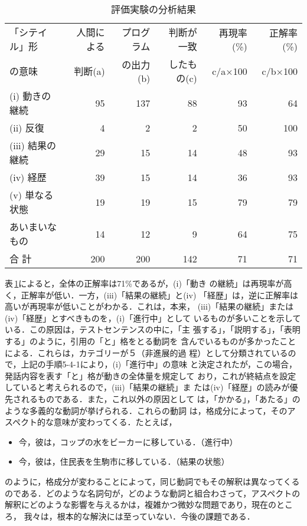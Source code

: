 \begin{table}[htb]
\caption{評価実験の分析結果}
\label{tab:evaluation}
\centering
\begin{tabular}{|l|r|r|r|r|r|}  \hline
「シテイル」形   & 人間による & プログラム & 判断が一致  & 再現率(\%) & 正解率(\%) \\ 
 の意味          & 判断(a)    & の出力(b)  & したもの(c) & c/a×100   & c/b×100 \\ \hline\hline
(i) 動きの継続   &  95 & 137 &  88 & 93 & 64 \\ \hline
(ii) 反復        &   4 &   2 &   2 & 50 & 100 \\ \hline
(iii) 結果の継続 &  29 &  15 &  14 & 48 & 93 \\ \hline
(iv) 経歴        &  39 &  15 &  14 & 36 & 93 \\ \hline
(v) 単なる状態   &  19 &  19 &  15 & 79 & 79 \\ \hline
あいまいなもの   &  14 &  12 &   9 & 64 & 75 \\ \hline
合  計           & 200 & 200 & 142 & 71 & 71 \\ \hline
\end{tabular}
\end{table}
\vspace*{-2mm}
表\,\ref{tab:evaluation}によると，全体の正解率は71\%であるが，(i)「動き
の継続」は再現率が高く，正解率が低い．一方，(iii)「結果の継続」と(iv)
「経歴」は，逆に正解率は高いが再現率が低いことがわかる．これは，本来，
(iii)「結果の継続」または(iv)「経歴」とすべきものを，(i)「進行中」として
いるものが多いことを示している．この原因は，テストセンテンスの中に，「主
張する」，「説明する」，「表明する」のように，引用の「と」格をとる動詞を
含んでいるものが多かったことによる．これらは，カテゴリーが５（非進展的過
程）として分類されているので，上記の手順5-4-1により，(i)「進行中」の意味
と決定されたが，この場合，発話内容を表す「と」格が動きの全体量を規定して
おり，これが終結点を設定していると考えられるので，(iii)「結果の継続」ま
たは(iv)「経歴」の読みが優先されるものである．また，これ以外の原因として
は，「かかる」，「あたる」のような多義的な動詞が挙げられる．これらの動詞
は，格成分によって，そのアスペクト的な意味が変わってくる．たとえば，
\begin{itemize}
\item [] 今，彼は，コップの水をビーカーに移している．（進行中）
\item [] 今，彼は，住民表を生駒市に移している．（結果の状態）
\end{itemize}
のように，格成分が変わることによって，同じ動詞でもその解釈は異なってくる
のである．どのような名詞句が，どのような動詞と組合わさって，アスペクトの
解釈にどのような影響を与えるかは，複雑かつ微妙な問題であり，現在のところ，
我々は，根本的な解決には至っていない．今後の課題である．

